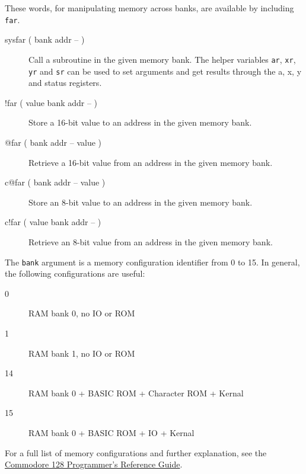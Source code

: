 These words, for manipulating memory across banks, are available by including \texttt{far}.

\begin{description}
    \item[sysfar ( bank addr -- )] Call a subroutine in the given memory bank. The helper variables \texttt{ar}, \texttt{xr}, \texttt{yr} and \texttt{sr} can be used to set arguments and get results through the a, x, y and status registers.
    \item[!far ( value bank addr -- )] Store a 16-bit value to an address in the given memory bank.
    \item[@far ( bank addr -- value )] Retrieve a 16-bit value from an address in the given memory bank.
    \item[c@far ( bank addr -- value )] Store an 8-bit value to an address in the given memory bank.
    \item[c!far ( value bank addr -- )] Retrieve an 8-bit value from an address in the given memory bank.
\end{description}

The \texttt{bank} argument is a memory configuration identifier from 0 to 15. In general, the following configurations are useful:

\begin{description}
    \item[0] RAM bank 0, no IO or ROM
    \item[1] RAM bank 1, no IO or ROM
    \item[14] RAM bank 0 + BASIC ROM + Character ROM + Kernal
    \item[15] RAM bank 0 + BASIC ROM + IO + Kernal
\end{description}

For a full list of memory configurations and further explanation, see the \href{https://archive.org/details/C128_Programmers_Reference_Guide_1986_Bamtam_Books}{Commodore 128 Programmer’s Reference Guide}.
